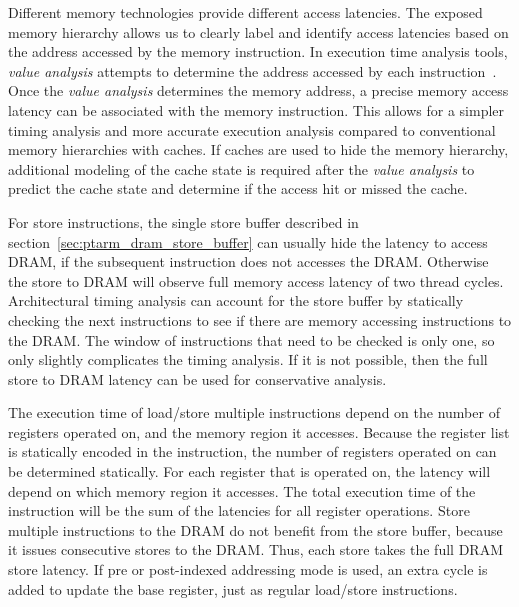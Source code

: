 Different memory technologies provide different access latencies. 
The exposed memory hierarchy allows us to clearly label and identify access latencies based on the address accessed by the memory instruction.
In execution time analysis tools, \emph{value analysis} attempts to determine the address accessed by each instruction~\cite{wilhelm-survey-paper}.
Once the \emph{value analysis} determines the memory address, a precise memory access latency can be associated with the memory instruction.    
This allows for a simpler timing analysis and more accurate execution analysis compared to conventional memory hierarchies with caches. 
If caches are used to hide the memory hierarchy, additional modeling of the cache state is required after the \emph{value analysis} to predict the cache state and determine if the access hit or missed the cache. 

For store instructions, the single store buffer described in section~\ref{sec:ptarm_dram_store_buffer} can usually hide the latency to access DRAM, if the subsequent instruction does not accesses the DRAM. 
Otherwise the store to DRAM will observe full memory access latency of two thread cycles.
Architectural timing analysis can account for the store buffer by statically checking the next instructions to see if there are memory accessing instructions to the DRAM.
The window of instructions that need to be checked is only one, so only slightly complicates the timing analysis.
If it is not possible, then the full store to DRAM latency can be used for conservative analysis. 

The execution time of load/store multiple instructions depend on the number of registers operated on, and the memory region it accesses. 
Because the register list is statically encoded in the instruction, the number of registers operated on can be determined statically.
For each register that is operated on, the latency will depend on which memory region it accesses. 
The total execution time of the instruction will be the sum of the latencies for all register operations. 
Store multiple instructions to the DRAM do not benefit from the store buffer, because it issues consecutive stores to the DRAM. 
Thus, each store takes the full DRAM store latency.
If pre or post-indexed addressing mode is used, an extra cycle is added to update the base register, just as regular load/store instructions. 

